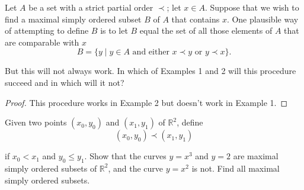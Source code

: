 \begin{exercise}\label{chapter1:section11:exercise3}
    Let $A$ be a set with a strict partial order $\prec$; let $x\in A$. Suppose that we wish to find a maximal simply ordered subset $B$ of $A$ that contains $x$. One plausible way of attempting to define $B$ is to let $B$ equal the set of all those elements of $A$ that are comparable with $x$
    \[
        B = \{ y \mid y\in A \text{ and either $x\prec y$ or $y\prec x$} \}.
    \]

    But this will not always work. In which of Examples 1 and 2 will this procedure succeed and in which will it not?
\end{exercise}

\begin{proof}
    This procedure works in Example 2 but doesn't work in Example 1.
\end{proof}

\begin{exercise}\label{chapter1:section11:exercise4}
    Given two points $(x_{0}, y_{0})$ and $(x_{1}, y_{1})$ of $\mathbb{R}^{2}$, define
    \[
        (x_{0}, y_{0}) \prec (x_{1}, y_{1})
    \]

    if $x_{0} < x_{1}$ and $y_{0}\leq y_{1}$. Show that the curves $y = x^{3}$ and $y = 2$ are maximal simply ordered subsets of $\mathbb{R}^{2}$, and the curve $y = x^{2}$ is not. Find all maximal simply ordered subsets.
\end{exercise}

